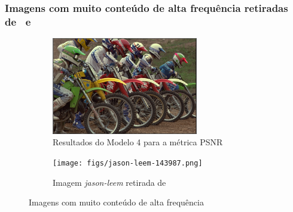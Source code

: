 \documentclass{beamer}
\begin{document}
\begin{frame}
\frametitle{Imagens com muito conteúdo de alta frequência retiradas de~\cite{clic} e~\cite{kodak}}
\begin{figure}
\centering
\begin{subfigure}{.5\textwidth}
  \centering
  \includegraphics[width=0.7\textwidth]{figs/kodim05.png}
  \caption{Resultados do Modelo 4 para a métrica PSNR}
  \label{fig:figs:sub1}
\end{subfigure}%
\begin{subfigure}{.5\textwidth}
    \centering
    \texttt{[image: figs/jason-leem-143987.png]}
    \caption{Imagem \textit{jason-leem} retirada de~\cite{clic}}
    \label{fig:figs:sub2}
\end{subfigure}
\caption{Imagens com muito conteúdo de alta frequência}
\end{figure}
\end{frame}
\end{document}
